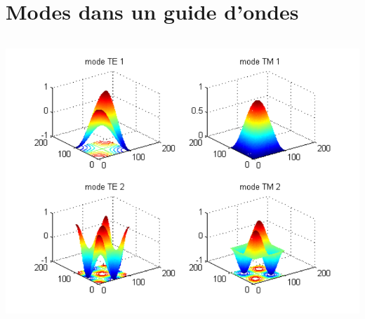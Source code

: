\documentclass[10pt]{article}
\begin{document}
 \section{Modes dans un guide d’ondes}
  \inputminted[linenos]{matlab}{GuideDOndes.m}
  \begin{center}
   \includegraphics{GuideDOndes}
  \end{center}
\end{document}
